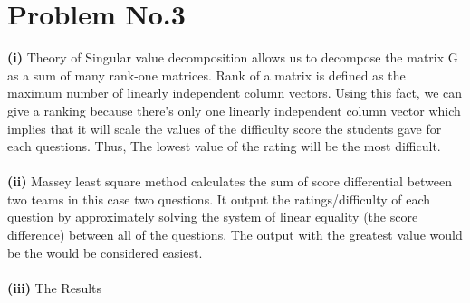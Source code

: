 \section*{Problem No.3} \label{sec:prob3}

\textbf{(i)} Theory of Singular value decomposition allows us to decompose the matrix G as a sum of many rank-one matrices. Rank of a matrix is defined as the maximum number of linearly independent column vectors. Using this fact, we can give a ranking because there's only one linearly independent column vector which implies that it will scale the values of the difficulty score the students gave for each questions. Thus, The lowest value of the rating will be the most difficult.
\\
\\
\textbf{(ii)} 
Massey least square method calculates the sum of score differential between two teams in this case two questions. It output the ratings/difficulty of each question by approximately solving the system of linear equality (the score difference) between all of the questions. The output with the greatest value would be the would be considered easiest. 
\\
\\
\textbf{(iii)} The Results
